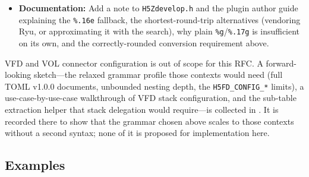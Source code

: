 \documentclass[../RFC-HDFG-2026-001.tex]{subfiles}
\begin{document}
\begin{notebox}
\begin{itemize}
    The requirement is checkable rather than assumed: \texttt{fmt-01c}
    () sweeps exact powers of two, the values at
    which a 1~ulp conversion error is observable, so a platform whose
    conversion is not correctly rounded fails the test suite rather than
    writing subtly wrong values.  Nor is a failing platform stranded --- the
    conversion is a leaf dependency, and supplying a correctly rounded
    routine there restores conformance without touching the format.  What
    does \emph{not} depend on this is filter execution: the pipeline runs
    from \texttt{cd\_values}, which the producer computed from its own parse,
    so a reader with a sloppy \texttt{strtod} misreads the introspected
    configuration but never changes how stored data is decoded.
  \item \textbf{Documentation:} Add a note to \texttt{H5Zdevelop.h} and the
    plugin author guide explaining the \texttt{\%.16e} fallback, the
    shortest-round-trip alternatives (vendoring Ryu, or approximating it
    with the search), why plain \texttt{\%g}/\texttt{\%.17g}
    is insufficient on its own, and the correctly-rounded conversion
    requirement above.
\end{itemize}
\end{notebox}


\begin{outofscope}
VFD and VOL connector configuration is out of scope for this RFC.  A
forward-looking sketch---the relaxed grammar profile those contexts would
need (full TOML v1.0.0 documents, unbounded nesting depth, the
\texttt{H5FD\_CONFIG\_*} limits), a use-case-by-use-case walkthrough of VFD
stack configuration, and the sub-table extraction helper that stack
delegation would require---is collected in
.  It is recorded there to show that the
grammar chosen above scales to those contexts without a second syntax;
none of it is proposed for implementation here.
\end{outofscope}

\subsection{Examples}
\label{sec:param-examples}
\end{document}
